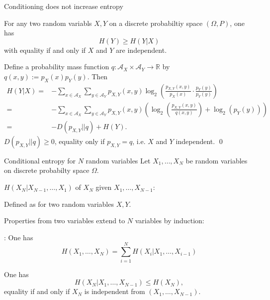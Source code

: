 \begin{frame}{Conditioning does not increase entropy}
\begin{proposition}
For any two random variabls $X,Y$ on a discrete probabiltiy space $(\Omega,P)$, one has 
\[
H(Y)\geq H(Y|X)
\]
with equality if and only if $X$ and $Y$ are independent. 
\end{proposition}
%
 Define a probability mass function $q:\mathcal{A}_X\times\mathcal{A}_Y\to\mathbb{R}$ by $q(x,y):=p_X(x)p_Y(y)$. 
Then 
\begin{align*}
H(Y|X)=&-\sum_{x\in\mathcal{A}_X}\sum_{y\in\mathcal{A}_Y}p_{X,Y}(x,y)\log_2\left(\frac{p_{X,Y}(x,y)}{p_X(x)}\cdot \frac{p_Y(y)}{p_Y(y)}\right)\\
=&-\sum_{x\in\mathcal{A}_X}\sum_{y\in\mathcal{A}_Y}p_{X,Y}(x,y)\left(\log_2\left(\frac{p_{X,Y}(x,y)}{q(x,y)}\right)+\log_2(p_Y(y))\right)\\
=&-D(p_{X,Y}||q)+H(Y). 
\end{align*}
$D(p_{X,Y}||q)\geq 0$, equality only if $p_{X,Y}=q$, i.e. $X$ and $Y$ independent. \qed
\end{frame}


\begin{frame}{Conditional entropy for $N$ random variables}
Let $X_1,\dots,X_N$ be random variables on discrete probabilty space $\Omega$.  
\bit
\item {} $H(X_N|X_{N-1},\dots,X_1)$ of $X_N$ given  $X_1,\dots,X_{N-1}$:  

Defined as for two random variables $X, Y$. 
\item Properties from two variables extend to $N$ variables by induction: 
\eit
\begin{proposition}
\bit
\item {}: One has
\[
H(X_1,\dots,X_N)=\sum_{i=1}^NH(X_i|X_1,\dots,X_{i-1})
\]
\item {} One has
\[
H(X_N|X_1,\dots,X_{N-1})\leq H(X_N),
\]
equality if and only if $X_N$ is independent from $(X_1,\dots,X_{N-1})$. 
\eit
\end{proposition}
\end{frame}




